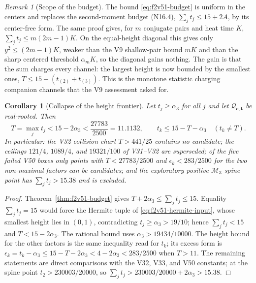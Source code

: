 \documentclass[11pt]{article}
\newtheorem{corollary}[theorem]{Corollary}
\theoremstyle{definition}
\theoremstyle{remark}
\newtheorem{remark}[theorem]{Remark}
\begin{document}
\begin{remark}[Scope of the budget]
\label{rem:f2v51-scope}
The bound \eqref{eq:f2v51-budget} is uniform in the centers and replaces
the second-moment budget \textup{(N16.4)}, \(\sum_jt_j\le15+2A\), by
its center-free form.  The same proof gives, for \(m\) conjugate pairs
and heat time \(K\), \(\sum_jt_j\le m(2m-1)K\).  On the equal-height
diagonal this gives only \(y^2\le(2m-1)K\), weaker than the V9
shallow-pair bound \(mK\) and than the sharp centered threshold
\(\alpha_mK\), so the diagonal gains nothing.  The gain is that the sum
charges every channel: the
largest height is now bounded by the smallest ones,
\(T\le15-(t_{(2)}+t_{(3)})\).  This is the monotone statistic
charging companion channels that the V9 assessment asked for.
\end{remark}

\begin{corollary}[Collapse of the height frontier]
\label{cor:f2v51-collapse}
Let \(t_j\ge\alpha_3\) for all \(j\) and let
\(\mathcal Q_{\bm c,\bm t}\) be real-rooted.  Then
\begin{equation}
 \boxed{T=\max_jt_j<15-2\alpha_3<\frac{27783}{2500}=11.1132,}
 \qquad
 t_k\le15-T-\alpha_3\quad(t_k\ne T).
 \label{eq:f2v51-collapse}
\end{equation}
In particular: the V32 collision chart \(T>441/25\) contains no
candidate; the ceilings \(121/4\), \(1089/4\), and \(19321/100\) of
V31--V32 are superseded; of the five failed V50 boxes only points with
\(T<27783/2500\) and \(\epsilon_k<283/2500\) for the two non-maximal
factors can be candidates; and the exploratory positive
\(\mathcal M_3\) spine point has \(\sum_jt_j>15.38\) and is excluded.
\end{corollary}

\begin{proof}
Theorem~\ref{thm:f2v51-budget} gives \(T+2\alpha_3\le\sum_jt_j\le15\).
Equality \(\sum_jt_j=15\) would force the Hermite tuple of
\eqref{eq:f2v51-hermite-input}, whose smallest height lies in
\((0,1)\), contradicting \(t_j\ge\alpha_3>19/10\); hence
\(\sum_jt_j<15\) and \(T<15-2\alpha_3\).  The rational bound uses
\(\alpha_3>19434/10000\).  The height bound for the other factors is the
same inequality read for \(t_k\); its excess form is
\(\epsilon_k=t_k-\alpha_3\le15-T-2\alpha_3<4-2\alpha_3<283/2500\) when
\(T>11\).  The remaining statements are direct comparisons with the V32,
V33, and V50 constants; at the spine point
\(t_2>230003/20000\), so \(\sum_jt_j>230003/20000+2\alpha_3>15.38\).
\end{proof}
\end{document}
